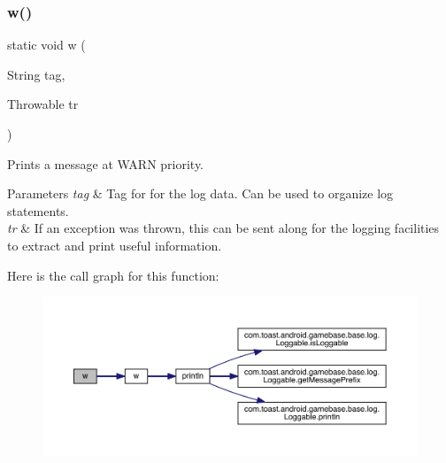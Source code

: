 \subsubsection{\texorpdfstring{w()}{w()}\hspace{0.1cm}{\footnotesize\ttfamily [3/3]}}
{\footnotesize\ttfamily static void w (\begin{DoxyParamCaption}\item[{String}]{tag,  }\item[{Throwable}]{tr }\end{DoxyParamCaption})\hspace{0.3cm}{\ttfamily [static]}}



Prints a message at W\+A\+RN priority. 


\begin{DoxyParams}{Parameters}
{\em tag} & Tag for for the log data. Can be used to organize log statements. \\
\hline
{\em tr} & If an exception was thrown, this can be sent along for the logging facilities to extract and print useful information. \\
\hline
\end{DoxyParams}
Here is the call graph for this function\+:
\nopagebreak
\begin{figure}[H]
\begin{center}
\leavevmode
\includegraphics[width=350pt]{classcom_1_1toast_1_1android_1_1gamebase_1_1base_1_1log_1_1_logger_aea8dff5a52edecf3597b8f086e941790_cgraph}
\end{center}
\end{figure}
\mbox{\label{classcom_1_1toast_1_1android_1_1gamebase_1_1base_1_1log_1_1_logger_a5454c01be0df340788095415a591ef89}} 
